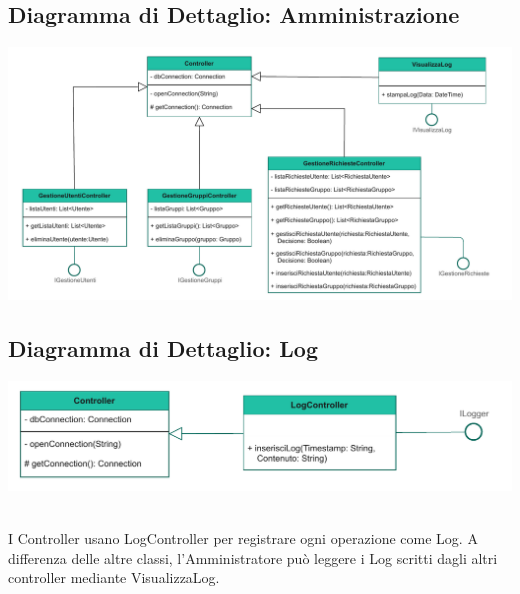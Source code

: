 \subsection*{Diagramma di Dettaglio: Amministrazione}
{}
\begin{adjustwidth}{-3cm}{0cm}
\includegraphics[scale=0.8]{progettazione/Progettazione-Dettaglio Amministratore.drawio.pdf}
\end{adjustwidth}
\vspace{0.5cm}


\subsection*{Diagramma di Dettaglio: Log}
{}
\begin{adjustwidth}{-2cm}{0cm}
\includegraphics[scale=1]{progettazione/Progettazione-DettagliLog.drawio.pdf}
\end{adjustwidth}
\vspace{0.5cm}

\\
I Controller usano LogController per registrare ogni operazione come Log. A differenza delle altre classi, l'Amministratore può leggere i Log scritti dagli altri controller mediante VisualizzaLog.\\
\vspace{2cm}


